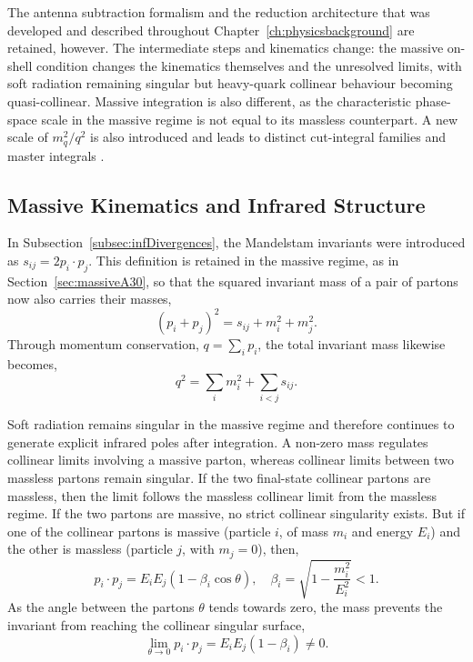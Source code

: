 The antenna subtraction formalism and the reduction architecture that was developed
and described throughout Chapter~\ref{ch:physicsbackground} are retained, however. The intermediate steps and kinematics change: the massive on-shell condition changes the
kinematics themselves and the unresolved limits, with soft radiation remaining
singular but heavy-quark collinear behaviour becoming quasi-collinear. Massive
integration is also different, as the characteristic phase-space scale in the massive
regime is not equal to its massless counterpart. A new scale of $m_q^2/q^2$ is also introduced and leads to
distinct cut-integral families and master integrals \cite{GehrmannDeRidder:2009fz}.

\subsection{Massive Kinematics and Infrared Structure}

In Subsection~\ref{subsec:infDivergences}, the Mandelstam invariants were introduced
as $s_{ij}=2p_i\cdot p_j$. This definition is retained in the massive regime, as in
Section~\ref{sec:massiveA30}, so that the squared invariant mass of a pair of partons
now also carries their masses,
\begin{equation}
    (p_i+p_j)^2 = s_{ij} + m_i^2 + m_j^2.
\end{equation}
Through momentum conservation, $q=\sum_i p_i$, the total invariant mass likewise becomes,
\begin{equation}
    q^2 = \sum_i m_i^2 + \sum_{i<j}s_{ij}.
\end{equation}

Soft radiation remains singular in the massive regime and therefore continues to
generate explicit infrared poles after integration. A non-zero mass regulates
collinear limits involving a massive parton, whereas collinear
limits between two massless partons remain singular.
If the two final-state collinear partons are massless, then the limit
follows the massless collinear limit from the massless regime. If the two partons
are massive, no strict collinear singularity exists. But if one of the collinear partons is massive (particle $i$, of mass $m_i$ and energy $E_i$) and the other is massless (particle $j$, with $m_j=0$), then,
\begin{equation}
    p_i\cdot p_j = E_iE_j(1-\beta_i\cos\theta),\quad \beta_i=\sqrt{1-\frac{m_i^2}{E_i^2}}<1.
\end{equation}
As the angle between the partons $\theta$ tends towards zero, the mass prevents the
invariant from reaching the collinear singular surface,
\begin{equation}
    \lim_{\theta\to 0}p_i\cdot p_j = E_iE_j(1-\beta_i)\neq 0.
\end{equation}

